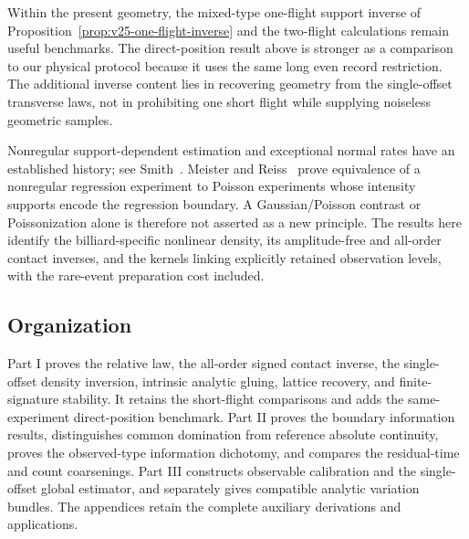 Within the present geometry, the mixed-type one-flight support inverse of
Proposition~\ref{prop:v25-one-flight-inverse} and the two-flight calculations
remain useful benchmarks.  The direct-position result above is stronger as
a comparison to our physical protocol because it uses the same long even
record restriction.  The additional inverse content lies in recovering
geometry from the single-offset transverse laws, not in prohibiting one
short flight while supplying noiseless geometric samples.

Nonregular support-dependent estimation and exceptional normal rates have
an established history; see Smith~\cite{Smith1985}.  Meister and
Reiss~\cite{MeisterReiss} prove equivalence of a nonregular regression
experiment to Poisson experiments whose intensity supports encode the
regression boundary.  A Gaussian/Poisson contrast or Poissonization alone
is therefore not asserted as a new principle.  The results here identify
the billiard-specific nonlinear density, its amplitude-free and all-order
contact inverses, and the kernels linking explicitly retained observation
levels, with the rare-event preparation cost included.

\subsection{Organization}

Part I proves the relative law, the all-order signed contact inverse, the
single-offset density inversion, intrinsic analytic gluing, lattice recovery,
and finite-signature stability.  It retains the short-flight comparisons
and adds the same-experiment direct-position benchmark.  Part II proves the
boundary information results, distinguishes common domination from reference
absolute continuity, proves the observed-type information dichotomy,
and compares the residual-time and count coarsenings.
Part III constructs observable calibration and the single-offset global
estimator, and separately gives compatible analytic variation bundles.
The appendices retain the complete auxiliary derivations and applications.